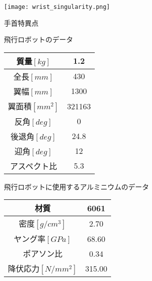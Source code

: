 \documentclass [titlepage, a4j, 11pt] {jsarticle}
\makeatletter
\newcommand{\tblcaption}[1]{\def\@captype{table}\caption{#1}}
\makeatother
\begin{document}
\begin{figure}[H]
	\begin{center}
		\texttt{[image: wrist\_singularity.png]} %
		\caption{手首特異点}
		\label{fig:sin3}
	\end{center}
\end{figure}

\begin{figure}[H]
\begin{minipage}{0.5 \hsize}
	\begin{center}
    \tblcaption{飛行ロボットのデータ}
    \label{table:data}
	\begin{tabular}{|c|c|}\hline
		質量$[kg] $& 1.2\\ \hline
		全長$[mm] $& 430\\ \hline
		翼幅$[mm] $& 1300 \\ \hline
		翼面積$[mm^2]$ & 321163 \\ \hline
		反角$[deg]$ & 0 \\ \hline
		後退角$[deg]$ & 24.8 \\ \hline
		迎角$[deg]$ & 12 \\ \hline
		アスペクト比 & 5.3 \\ \hline
	\end{tabular}
	\end{center}
	\end{minipage}
	\begin{minipage}{0.5 \hsize}
	\begin{center}
    \tblcaption{飛行ロボットに使用するアルミニウムのデータ}
    \label{table:almi}
	\begin{tabular}{|c|c|}\hline
		材質 & 6061\\ \hline
		密度$[g/cm^3]$ & 2.70 \\ \hline
		ヤング率$[GPa]$ & 68.60 \\ \hline
		ポアソン比 & 0.34 \\ \hline
		降伏応力$[N/mm^2]$ & 315.00 \\ \hline
	\end{tabular}
	\end{center}
	\end{minipage}
\end{figure}
\end{document}
